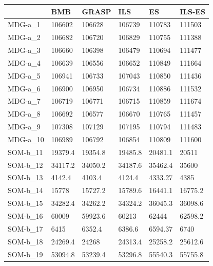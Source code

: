 \documentclass[11pt,a4paper]{article}
\begin{document}
	
	\begin{table}[H]
		\centering
		\begin{tabular}{l|l|l|l|l|l|}
			\cline{2-6}
			& BMB & GRASP & ILS & ES & ILS-ES \\ \hline
			\multicolumn{1}{|l|}{MDG-a\_1} & 106602 & 106628 & 106739 & 110783 & 111503 \\ \hline
			\multicolumn{1}{|l|}{MDG-a\_2} & 106682 & 106720 & 106829 & 110755 & 111388 \\ \hline
			\multicolumn{1}{|l|}{MDG-a\_3} & 106660 & 106398 & 106479 & 110694 & 111477 \\ \hline
			\multicolumn{1}{|l|}{MDG-a\_4} & 106639 & 106556 & 106652 & 110849 & 111664 \\ \hline
			\multicolumn{1}{|l|}{MDG-a\_5} & 106941 & 106733 & 107043 & 110850 & 111436 \\ \hline
			\multicolumn{1}{|l|}{MDG-a\_6} & 106900 & 106950 & 106734 & 110886 & 111532 \\ \hline
			\multicolumn{1}{|l|}{MDG-a\_7} & 106719 & 106771 & 106715 & 110859 & 111674 \\ \hline
			\multicolumn{1}{|l|}{MDG-a\_8} & 106692 & 106577 & 106670 & 110765 & 111457 \\ \hline
			\multicolumn{1}{|l|}{MDG-a\_9} & 107308 & 107129 & 107195 & 110794 & 111483 \\ \hline
			\multicolumn{1}{|l|}{MDG-a\_10} & 106989 & 106792 & 106854 & 110809 & 111600 \\ \hline
			\multicolumn{1}{|l|}{SOM-b\_11} & 19379.4 & 19354.8 & 19485.8 & 20481.1 & 20511 \\ \hline
			\multicolumn{1}{|l|}{SOM-b\_12} & 34117.2 & 34050.2 & 34187.6 & 35462.4 & 35600 \\ \hline
			\multicolumn{1}{|l|}{SOM-b\_13} & 4142.4 & 4103.4 & 4124.4 & 4333.27 & 4385 \\ \hline
			\multicolumn{1}{|l|}{SOM-b\_14} & 15778 & 15727.2 & 15789.6 & 16441.1 & 16775.2 \\ \hline
			\multicolumn{1}{|l|}{SOM-b\_15} & 34282.4 & 34262.2 & 34324.2 & 36045.3 & 36098.6 \\ \hline
			\multicolumn{1}{|l|}{SOM-b\_16} & 60009 & 59923.6 & 60213 & 62444 & 62598.2 \\ \hline
			\multicolumn{1}{|l|}{SOM-b\_17} & 6415 & 6352.4 & 6386.6 & 6594.37 & 6740 \\ \hline
			\multicolumn{1}{|l|}{SOM-b\_18} & 24269.4 & 24268 & 24313.4 & 25258.2 & 25612.6 \\ \hline
			\multicolumn{1}{|l|}{SOM-b\_19} & 53094.8 & 53239.4 & 53296.8 & 55540.3 & 55755.8 \\ \hline

\end{tabular}
\end{table}
\end{document}
